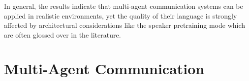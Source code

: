 In general, the results indicate that multi-agent communication systems can be applied in realistic environments, yet the quality of their language is strongly affected by architectural considerations like the speaker pretraining mode which are often glossed over in the literature.

\section{Multi-Agent Communication}

